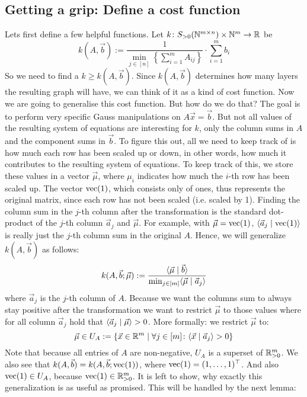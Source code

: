 \subsection{Getting a grip: Define a cost function}
Lets first define a few helpful functions. Let $k\colon S_{>0}(\mathbb{N}^{m \times n}) \times \mathbb{N}^m \to \mathbb{R}$ be
$$k(A, \vec b) := \frac{1}{\min_{j \in [n]} \left\{ \sum_{i=1}^{m}A_{ij}\right\}}\cdot \sum_{i=1}^{m}b_i$$
So we need to find a $k \geq k(A, \vec b)$. Since $k(A, \vec b)$ determines how many layers the resulting graph will have, we can think of it as a kind of cost function. Now we are going to generalise this cost function. But how do we do that? The goal is to perform very specific Gauss manipulations on $A\vec x = \vec b$. But not all values of the resulting system of equations are interesting for $k$, only the column sums in $A$ and the component sums in $\vec b$. To figure this out, all we need to keep track of is how much each row has been scaled up or down, in other words, how much it contributes to the resulting system of equations. To keep track of this, we store these values in a vector $\vec\mu$, where $\mu_i$ indicates how much the $i$-th row has been scaled up. The vector $\operatorname{vec}(1)$, which consists only of ones, thus represents the original matrix, since each row has not been scaled (i.e. scaled by 1). Finding the column sum in the $j$-th column after the transformation is the standard dot-product of the $j$-th column $\vec a_j$ and $\vec\mu$. For example, with $\vec \mu = \operatorname{vec}(1)$, $\langle \vec a_j \mid \operatorname{vec}(1) \rangle$ is really just the $j$-th column sum in the original $A$. Hence, we will generalize $k(A, \vec b)$ as follows:
$$k(A, \vec b; \vec \mu) := \frac{\langle \vec{\mu} \mid \vec b \rangle}{\min_{j \in [m]} \langle \vec \mu \mid \vec a_j \rangle}$$
where $\vec a_j$ is the $j$-th column of $A$. Because we want the columns sum to always stay positive after the transformation we want to restrict $\vec\mu$ to those values where for all column $\vec a_j$ hold that $\langle \vec a_j \mid \vec\mu \rangle > 0$. More formally: we restrict $\vec\mu$ to:
$$\vec \mu \in U_A := \{\vec x \in \mathbb{R}^m \mid \forall j \in [m]\colon \langle \vec x \mid \vec a_j \rangle > 0\}$$
Note that because all entries of $A$ are non-negative, $U_A$ is a superset of $\mathbb{R}_{>0}^m$. We also see that $k(A, \vec b) = k(A, \vec b; \operatorname{vec}(1))$, where $\operatorname{vec}(1) = (1, \dots, 1)^\top$. And also $\operatorname{vec}(1) \in U_A$, because $\operatorname{vec}(1) \in \mathbb{R}^m_{>0}$. It is left to show, why exactly this generalization is as useful as promised. This will be handled by the next lemma:
